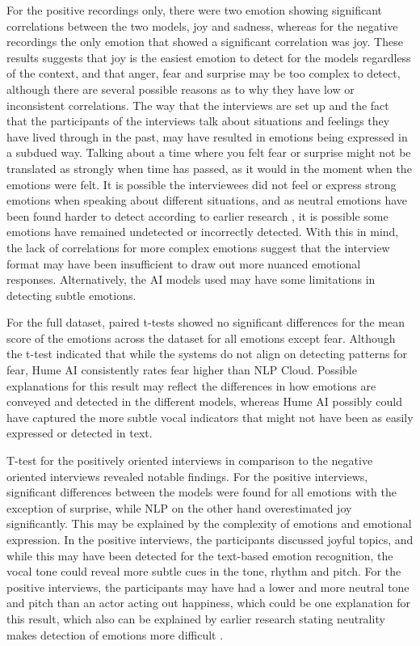 For the positive recordings only, there were two emotion showing significant correlations between the two models, joy and sadness, whereas for the negative recordings the only emotion that showed a significant correlation was joy. These results suggests that joy is the easiest emotion to detect for the models regardless of the context, and that anger, fear and surprise may be too complex to detect, although there are several possible reasons as to why they have low or inconsistent correlations. The way that the interviews are set up and the fact that the participants of the interviews talk about situations and feelings they have lived through in the past, may have resulted in emotions being expressed in a subdued way. Talking about a time where you felt fear or surprise might not be translated as strongly when time has passed, as it would in the moment when the emotions were felt. It is possible the interviewees did not feel or express strong emotions when speaking about different situations, and as neutral emotions have been found harder to detect according to earlier research \autocite{Cao2015}, it is possible some emotions have remained undetected or incorrectly detected. With this in mind, the lack of correlations for more complex emotions suggest that the interview format may have been insufficient to draw out more nuanced emotional responses. Alternatively, the AI models used may have some limitations in detecting subtle emotions.

For the full dataset, paired t-tests showed no significant differences for the mean score of the emotions across the dataset for all emotions except fear. Although the t-test indicated that while the systems do not align on detecting patterns for fear, Hume AI consistently rates fear higher than NLP Cloud. Possible explanations for this result may reflect the differences in how emotions are conveyed and detected in the different models, whereas Hume AI possibly could have captured the more subtle vocal indicators that might not have been as easily expressed or detected in text.

T-test for the positively oriented interviews in comparison to the negative oriented interviews revealed notable findings. For the positive interviews, significant differences between the models were found for all emotions with the exception of surprise, while NLP on the other hand overestimated joy significantly. This may be explained by the complexity of emotions and emotional expression. In the positive interviews, the participants discussed joyful topics, and while this may have been detected for the text-based emotion recognition, the vocal tone could reveal more subtle cues in the tone, rhythm and pitch. For the positive interviews, the participants may have had a lower and more neutral tone and pitch than an actor acting out happiness, which could be one explanation for this result, which also can be explained by earlier research stating neutrality makes detection of emotions more difficult \autocite{Cao2015}.


